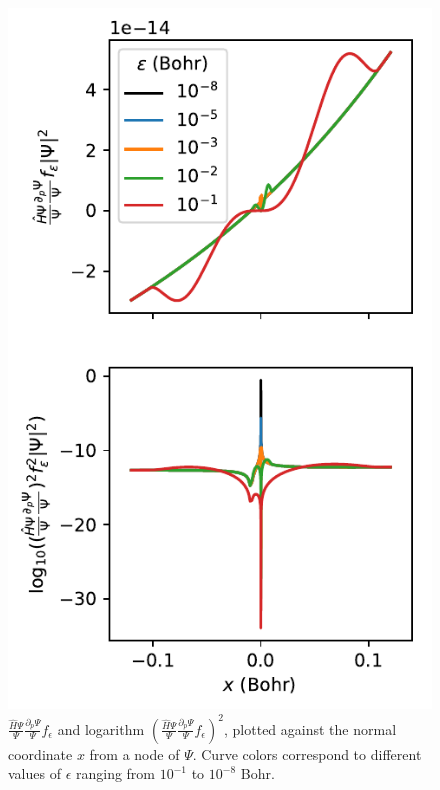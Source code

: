 \documentclass[twocolumn]{revtex4-1}
\begin{document}
\begin{figure}
\includegraphics[width=1.0\columnwidth]{../2_plots/viznode.pdf}
\caption{$\frac{\hat{H}\Psi}{\Psi}\frac{\partial_p \Psi}{\Psi} f_\epsilon$ and logarithm $(\frac{\hat{H}\Psi}{\Psi}\frac{\partial_p \Psi}{\Psi} f_\epsilon)^2$, plotted against the normal coordinate $x$ from a node of $\Psi$. Curve colors correspond to different values of $\epsilon$ ranging from $10^{-1}$ to $10^{-8}$ Bohr.}
\end{figure}
\end{document}
